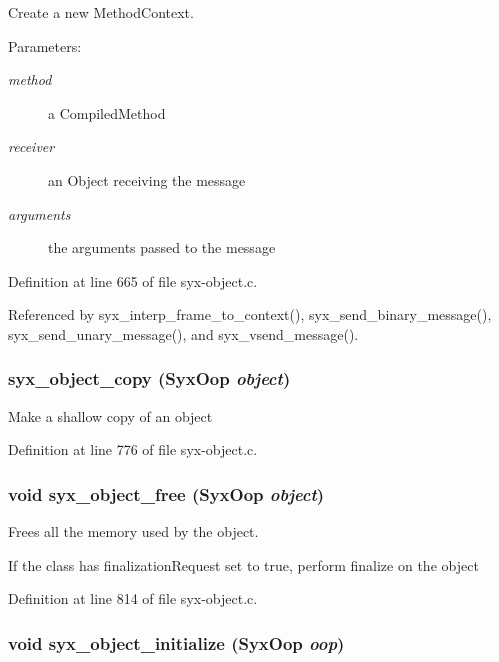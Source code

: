 Create a new MethodContext.

\begin{Desc}
\item[Parameters:]
\begin{description}
\item[{\em method}]a CompiledMethod \item[{\em receiver}]an Object receiving the message \item[{\em arguments}]the arguments passed to the message \end{description}
\end{Desc}


Definition at line 665 of file syx-object.c.

Referenced by syx\_\-interp\_\-frame\_\-to\_\-context(), syx\_\-send\_\-binary\_\-message(), syx\_\-send\_\-unary\_\-message(), and syx\_\-vsend\_\-message().\hypertarget{syx-object_8c_87ae9f3c62c6c608d8d0c854067048a1}{
\subsubsection{ syx\_\-object\_\-copy ({\bf SyxOop} {\em object})}}
\label{syx-object_8c_87ae9f3c62c6c608d8d0c854067048a1}


Make a shallow copy of an object 

Definition at line 776 of file syx-object.c.\hypertarget{syx-object_8c_5f525b9cf7e1db14135a63a6d11e1acd}{
\subsubsection{\setlength{\rightskip}{0pt plus 5cm}void syx\_\-object\_\-free ({\bf SyxOop} {\em object})}}
\label{syx-object_8c_5f525b9cf7e1db14135a63a6d11e1acd}


Frees all the memory used by the object.

If the class has finalizationRequest set to true, perform finalize on the object 

Definition at line 814 of file syx-object.c.\hypertarget{syx-object_8c_9ae6644e857a7db2d3ddbbf45d746739}{
\subsubsection{\setlength{\rightskip}{0pt plus 5cm}void syx\_\-object\_\-initialize ({\bf SyxOop} {\em oop})}}
\label{syx-object_8c_9ae6644e857a7db2d3ddbbf45d746739}


